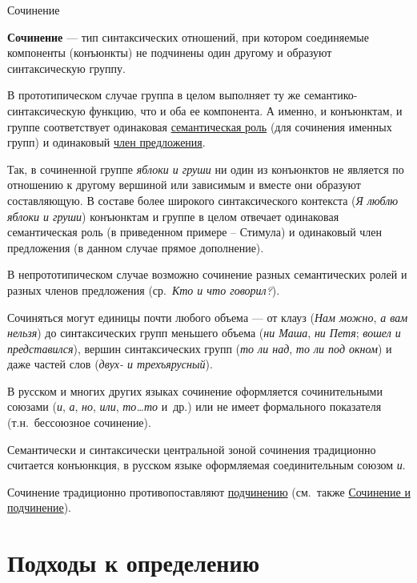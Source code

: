 Сочинение

\textbf{Сочинение} --- тип синтаксических отношений, при котором
соединяемые компоненты (конъюнкты) не подчинены один другому и образуют
синтаксическую группу.

В прототипическом случае группа в целом выполняет ту же
семантико-синтаксическую функцию, что и оба ее компонента. А именно, и
конъюнктам, и группе соответствует одинаковая \underline{семантическая
  роль} (для сочинения именных групп) и одинаковый \underline{член
  предложения}.

Так, в сочиненной группе \textit{яблоки и груши} ни один из конъюнктов не
является по отношению к другому вершиной или зависимым и вместе они
образуют составляющую. В составе более широкого синтаксического
контекста (\textit{Я люблю яблоки и груши}) конъюнктам и группе в целом
отвечает одинаковая семантическая роль (в приведенном примере --
Стимула) и одинаковый член предложения (в данном случае прямое
дополнение).

В непрототипическом случае возможно сочинение разных семантических ролей
и разных членов предложения (ср.~\textit{Кто и что говорил?}).

Сочиняться могут единицы почти любого объема --- от клауз (\textit{Нам
  можно}, \textit{а вам нельзя}) до синтаксических групп меньшего объема
(\textit{ни Маша}, \textit{ни Петя}; \textit{вошел и представился}), вершин
синтаксических групп (\textit{то ли над}, \textit{то ли под окном}) и даже
частей слов (\textit{двух- и трехъярусный}).

В русском и многих других языках сочинение оформляется сочинительными
союзами (\textit{и}, \textit{а}, \textit{но}, \textit{или}, \textit{то\ldots то}
и~др.) или не имеет формального показателя (т.н.~бессоюзное сочинение).

Семантически и синтаксически центральной зоной сочинения традиционно
считается конъюнкция, в русском языке оформляемая соединительным союзом
\textit{и}.

Сочинение традиционно противопоставляют \underline{подчинению}
(см.~также \underline{Сочинение и подчинение}).

\tableofcontents

\section{Подходы к
  определению}\label{ux43fux43eux434ux445ux43eux434ux44b-ux43a-ux43eux43fux440ux435ux434ux435ux43bux435ux43dux438ux44e}

